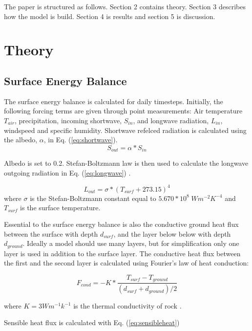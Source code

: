 \documentclass[a4paper,11pt,twocolumn]{article}
\begin{document}
The paper is structured as follows. Section 2 contains theory. Section 3 describes how the model is build. Section 4 is results and section 5 is discussion. 
\
\section{Theory}


\subsection{Surface Energy Balance}

The surface energy balance is calculated for daily timesteps. Initially, the following forcing terms are given through point  measurements: Air temperature $T_{air}$, precipitation, incoming shortwave, $S_{in}$, and longwave radiation, $L_{in}$, windspeed and specific humidity.
Shortwave refelced radiation is calculated using the albedo, $\alpha$, in Eq. (\ref{eq:shortwave}).
\begin{equation}
	S_{out} = \alpha * S_{in}
	\label{eq:shortwave}
\end{equation}

Albedo is set to 0.2. Stefan-Boltzmann law is then used to calculate the longwave outgoing radiation in Eq. (\ref{eq:longwave}) \cite{dingman}.

\begin{equation}
	L_{out} = \sigma * (T_{surf}+273.15)^4
	\label{eq:longwave}
\end{equation}
where $\sigma$ is the Stefan-Boltzmann constant equal to $5.670*10^8 \; Wm^{-2}K^{-4}$ and $T_{surf}$ is the surface temperature. 

Essential to the surface energy balance is also the conductive ground heat flux between the surface with depth $d_{surf}$, and the layer below below with depth $d_{ground}$. Ideally a model should use many layers, but for simplification only one layer is used in addition to the surface layer. The conductive heat flux between the first and the second layer is calculated using Fourier's law of heat conduction:

\begin{equation}
F_{cond} = 
-K*\frac{T_{surf}-T_{ground}}{(d_{surf}+d_{ground})/2}
\end{equation}

where $K = 3 Wm^{-1}k^{-1}$ is the thermal conductivity of rock \cite{labus}. 

Sensible heat flux is calculated with Eq. (\ref{eq:sensibleheat})
\end{document}
